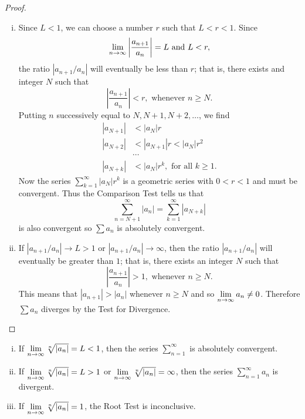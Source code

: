 \documentclass[a4paper,8pt]{article}
\begin{document}
\begin{outline}
    \begin{proof}
      \begin{enumerate}[i.]
        \item
          Since \(L < 1\), we can choose a number \(r\) such that \(L < r < 1\). Since \[\lim\limits_{n\rightarrow \infty^{}}\left|\frac{a_{n+1}}{a_n}\right| = L \text{ and }
          L < r, \] the ratio \(|a_{n+1}/a_n|\) will eventually be less than \(r\); that is, there exists and integer \(N\) such that
          \[ \left|\frac{a_{n+1}}{a_n}\right| < r, \text{ whenever } n \geq N\text{.} \]
          Putting \(n\) successively equal to \(N, N+1, N+2, \ldots\), we find
          \begin{align*}
            |a_{N+1}| &< |a_N|r \\
            |a_{N+2}| &< |a_{N+1}|r < |a_N|r^2 \\
                      &\cdots \\
            |a_{N+k}| &< |a_N|r^k, \text{ for all } k \geq 1\text{.}
          \end{align*}
          Now the series \( \sum_{k=1}^{\infty}|a_N|r^k \) is a geometric series with \(0 < r < 1\) and must be convergent. Thus the Comparison Test
          tells us that \[ \sum_{n=N+1}^{\infty} |a_n| = \sum_{k=1}^{\infty} |a_{N+k}| \] is also convergent so \(\sum a_n\) is absolutely convergent.
        \item
          If \(|a_{n+1}/a_n| \rightarrow L > 1\) or \(|a_{n+1}/a_n| \rightarrow \infty\), then the ratio \(|a_{n+1}/a_n|\) will eventually be greater
          than \(1\); that is, there exists an integer \(N\) such that \[ \left|\frac{a_{n+1}}{a_n}\right| > 1,\text{ whenever } n \geq N\text{.} \]
          This means that \(|a_{n+1}| > |a_n|\) whenever \(n \geq N\) and so \(\lim\limits_{n\rightarrow \infty^{}} a_n \neq 0\). Therefore \(\sum a_n\) diverges by
          the Test for Divergence.
      \end{enumerate}
    \end{proof}

    \begin{enumerate}[i.]
      \item
        If \(\lim\limits_{n\rightarrow \infty^{}} \sqrt[n]{|a_n|} = L < 1\), then the series \(\sum_{n=1}^{\infty}\) is absolutely convergent.
      \item
        If \(\lim\limits_{n\rightarrow \infty^{}} \sqrt[n]{|a_n|} = L > 1\) or \(\lim\limits_{n\rightarrow \infty^{}} \sqrt[n]{|a_n|} = \infty\), then the series \(\sum_{n=1}^{\infty} a_n\)
        is divergent.
      \item
        If \(\lim\limits_{n\rightarrow \infty^{}} \sqrt[n]{|a_n|} = 1\), the Root Test is inconclusive.
    \end{enumerate}

\end{outline}
\end{document}
